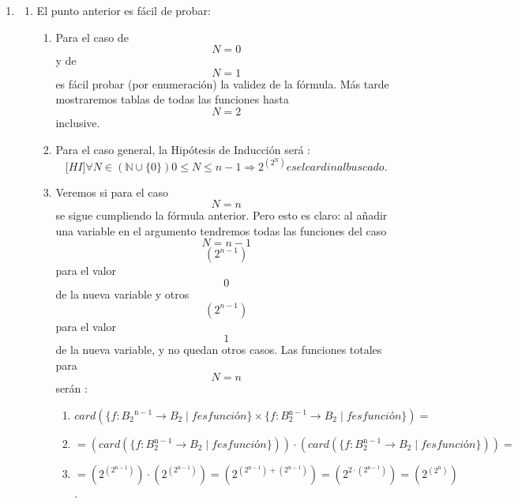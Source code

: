 \begin{enumerate}
\def\labelenumi{\arabic{enumi}.}
\setcounter{enumi}{1}
\item
  \begin{enumerate}
  \def\labelenumii{\arabic{enumii}.}
  \item
    El punto anterior es fácil de probar:

    \begin{enumerate}
    \def\labelenumiii{\arabic{enumiii}.}
    \item
      Para el caso de \[N = 0\] y de \[N = 1\] es fácil probar (por
      enumeración) la vali\-dez de la fórmula. Más tarde mostraremos
      tablas de todas las funciones hasta \[N = 2\] inclusive.
    \item
      Para el caso general, la Hipótesis de Inducción será
      :\[{\lbrack\mathbf{\mathit{HI}}\rbrack}\forall{N \in {({\mathbb{N} \cup {\{ 0\}}})}}{{0 \leq N} \leq {n - 1}}\Rightarrow 2^{(2^{\mathbf{\mathrm{N}}})}\mathit{es}\mathit{el}\mathit{cardinal}\mathit{buscado.}\]
    \item
      Veremos si para el caso \[N = n\] se sigue cumpliendo la fórmula
      anterior. Pero esto es claro: al añadir una variable en el
      argumento tendremos todas las funcio\-nes del caso \[N = {n - 1}\]
      \[(2^{n - 1})\] para el valor \[0\] de la nueva variable y otros
      \[(2^{n - 1})\] para el valor \[1\] de la nueva variable, y no
      quedan otros casos. Las funciones totales para \[N = n\] serán :

      \begin{enumerate}
      \def\labelenumiv{\arabic{enumiv}.}
      \tightlist
      \item
        \[\mathit{card}{{({{\{{f:{{B_{\mathbf{\mathrm{2}}}}^{\mathbf{\mathrm{n - 1}}}\rightarrow B_{\mathbf{\mathrm{2}}}}{\mid}f\mathit{es}\mathit{función}}\}} \times {\{{f:{B_{\mathbf{\mathrm{2}}}^{\mathbf{\mathrm{n - 1}}}\rightarrow B_{\mathbf{\mathrm{2}}}}{\mid}f\mathit{es}\mathit{función}}\}}})} =}\]
      \item
        \[{= {{({\mathit{card}{({\{{f:{B_{\mathbf{\mathrm{2}}}^{\mathbf{\mathrm{n - 1}}}\rightarrow B_{\mathbf{\mathrm{2}}}}{\mid}f\mathit{es}\mathit{función}}\}})}})} \cdot {({\mathit{card}{({\{{f:{B_{\mathbf{\mathrm{2}}}^{\mathbf{\mathrm{n - 1}}}\rightarrow B_{\mathbf{\mathrm{2}}}}{\mid}f\mathit{es}\mathit{función}}\}})}})}}} = {}\]
      \item
        \[{{{= {{(2^{(2^{\mathbf{\mathrm{n - 1}}})})} \cdot {(2^{(2^{\mathbf{\mathrm{n - 1}}})})}}} = {(2^{{(2^{\mathbf{\mathrm{n - 1}}})} + {(2^{\mathbf{\mathrm{n - 1}}})}})}} = {(2^{2 \cdot {(2^{\mathbf{\mathrm{n - 1}}})}})}} = {(2^{(2^{\mathbf{\mathrm{n}}})})}\].
      \end{enumerate}
    \end{enumerate}
  \end{enumerate}
\end{enumerate}

